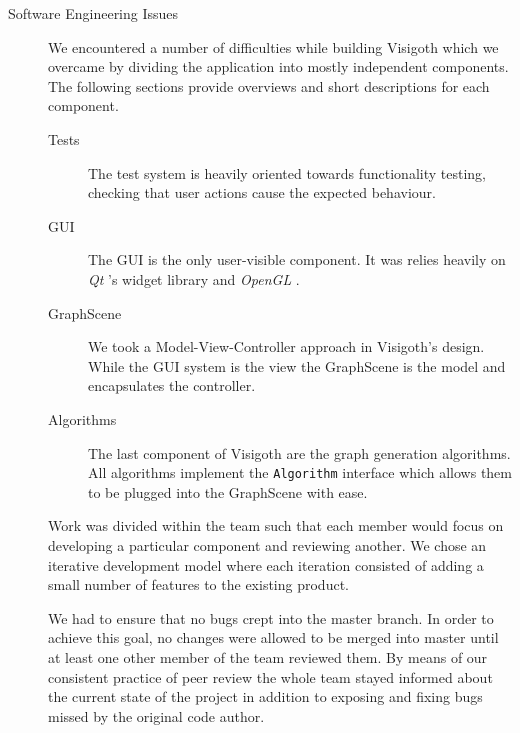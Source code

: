 \documentclass[a4paper,11pt]{article}
\newcommand{\code}[1]{\texttt{#1}}
\newcommand{\buzz}[1]{\emph{#1}}
\newcommand{\Qt}{\buzz{Qt} }
\newcommand{\OpenGL}{\buzz{OpenGL} }
\begin{document}
\begin{description}
\item[Software Engineering Issues]

  We encountered a number of difficulties while building Visigoth
  which we overcame by dividing the application into mostly
  independent components. The following sections provide overviews
  and short descriptions for each component.

  \begin{description}
  \item[Tests] The test system is heavily oriented towards
    functionality testing, checking that user actions cause the
    expected behaviour.

  \item[GUI] The GUI is the only user-visible component. It was relies
    heavily on \Qt's widget library and \OpenGL.

  \item[GraphScene] We took a Model-View-Controller approach in
    Visigoth's design. While the GUI system is the view the
    GraphScene is the model and encapsulates the controller.

  \item[Algorithms] The last component of Visigoth are the graph
    generation algorithms. All algorithms implement the
    \code{Algorithm} interface which allows them to be plugged into
    the GraphScene with ease.
  \end{description}

  Work was divided within the team such that each member would focus
  on developing a particular component and reviewing another. We chose
  an iterative development model where each iteration consisted of
  adding a small number of features to the existing product.

  We had to ensure that no bugs crept into the master branch. In order
  to achieve this goal, no changes were allowed to be merged into
  master until at least one other member of the team reviewed them.
  By means of our consistent practice of peer review the whole team
  stayed informed about the current state of the project in addition
  to exposing and fixing bugs missed by the original code author.


\end{description}
\end{document}

